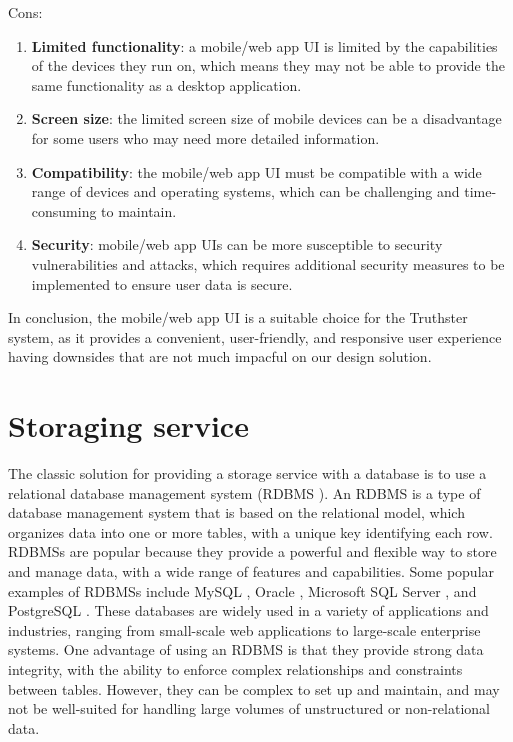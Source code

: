\documentclass[target=mst,aauheader=]{thud}
\begin{document}
Cons:

\begin{enumerate}
    
    \item \textbf{Limited functionality}: a mobile/web app UI is limited by the capabilities of the devices they run on, which means they may not be able to provide the same functionality as a desktop application.
    \item \textbf{Screen size}: the limited screen size of mobile devices can be a disadvantage for some users who may need more detailed information.
    \item \textbf{Compatibility}: the mobile/web app UI must be compatible with a wide range of devices and operating systems, which can be challenging and time-consuming to maintain.
    \item \textbf{Security}: mobile/web app UIs can be more susceptible to security vulnerabilities and attacks, which requires additional security measures to be implemented to ensure user data is secure.

\end{enumerate}

In conclusion, the mobile/web app UI is a suitable choice for the Truthster system, as it provides a convenient, user-friendly, and responsive user experience having downsides that are not much impacful on our design solution.

\section{Storaging service}

The classic solution for providing a storage service with a database is to use a relational database management system (RDBMS \cite{RDBMS}). An RDBMS is a type of database management system that is based on the relational model, which organizes data into one or more tables, with a unique key identifying each row. RDBMSs are popular because they provide a powerful and flexible way to store and manage data, with a wide range of features and capabilities. Some popular examples of RDBMSs include MySQL \cite{mySQL}, Oracle \cite{oracleDb}, Microsoft SQL Server \cite{microsoftSQL}, and PostgreSQL \cite{postgreSQL}. These databases are widely used in a variety of applications and industries, ranging from small-scale web applications to large-scale enterprise systems. One advantage of using an RDBMS is that they provide strong data integrity, with the ability to enforce complex relationships and constraints between tables. However, they can be complex to set up and maintain, and may not be well-suited for handling large volumes of unstructured or non-relational data.
\end{document}

